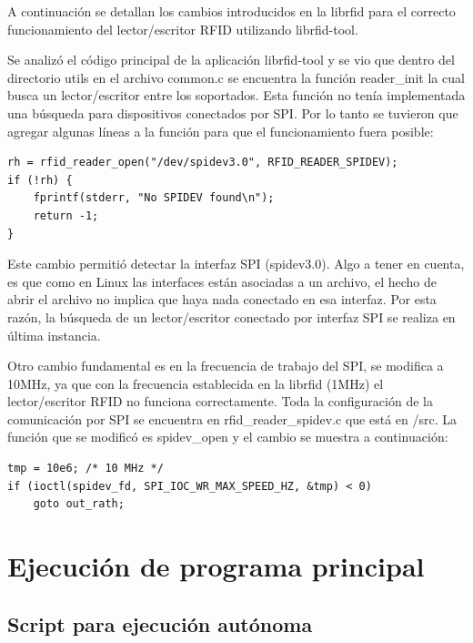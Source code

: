 \bigskip
{}
A continuación se detallan los cambios introducidos en la librfid para el correcto funcionamiento del lector/escritor RFID utilizando librfid-tool.

\bigskip
Se analizó el código principal de la aplicación librfid-tool y se vio que dentro del directorio utils en el archivo common.c se encuentra la función reader\_init la cual busca un lector/escritor entre los soportados. Esta función no tenía implementada una búsqueda para dispositivos conectados por SPI. Por lo tanto se tuvieron que agregar algunas líneas a la función para que el funcionamiento fuera posible:

\begin{verbatim}
rh = rfid_reader_open("/dev/spidev3.0", RFID_READER_SPIDEV);
if (!rh) {
    fprintf(stderr, "No SPIDEV found\n");
    return -1;
}
\end{verbatim}

Este cambio permitió detectar la interfaz SPI (spidev3.0). Algo a tener en cuenta, es que como en Linux las interfaces están asociadas a un archivo, el hecho de abrir el archivo no implica que haya nada conectado en esa interfaz. Por esta razón, la búsqueda de un lector/escritor conectado por interfaz SPI se realiza en última instancia.

\bigskip
Otro cambio fundamental es en la frecuencia de trabajo del SPI, se modifica a 10MHz, ya que con la frecuencia establecida en la librfid (1MHz) el lector/escritor RFID no funciona correctamente. Toda la configuración de la comunicación por SPI se encuentra en rfid\_reader\_spidev.c que está en /src.
La función que se modificó es spidev\_open y el cambio se muestra a continuación:

\begin{verbatim}
tmp = 10e6; /* 10 MHz */
if (ioctl(spidev_fd, SPI_IOC_WR_MAX_SPEED_HZ, &tmp) < 0)
    goto out_rath;
\end{verbatim}

\section{Ejecución de programa principal}

\subsection{Script para ejecución autónoma}
